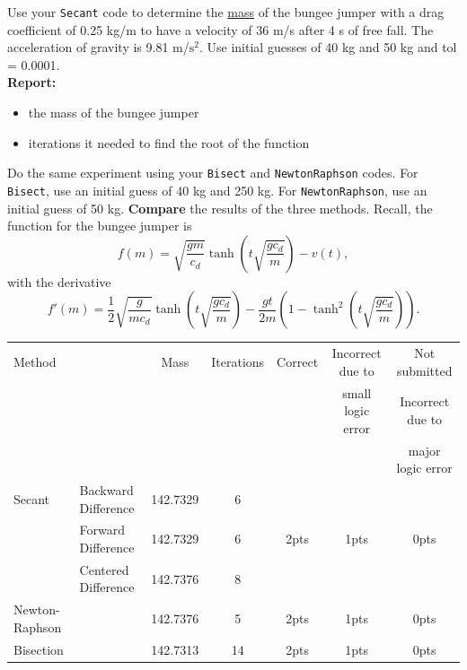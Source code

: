 \documentclass[11pt]{article}
\begin{document}
\begin{enumerate}[(a)]
	Use your \texttt{Secant} code to determine the \underline{mass} of the bungee jumper with a drag coefficient of 0.25 kg/m to have a velocity of 36 m/s after 4 s of free fall. The acceleration of gravity is 9.81 m/$\textrm{s}^2$. Use initial guesses of 40 kg and 50 kg and tol = 0.0001.\\ 
	\vspace{5pt}
	\textbf{Report:}
	\begin{itemize}
		\item the mass of the bungee jumper
		\item iterations it needed to find the root of the function
	\end{itemize}
	Do the same experiment using your \texttt{Bisect} and \texttt{NewtonRaphson} codes. For \texttt{Bisect}, use an initial guess of 40 kg and 250 kg. For \texttt{NewtonRaphson}, use an initial guess of 50 kg. \textbf{Compare} the results of the three methods. Recall, the function for the bungee jumper is
	$$f(m) = \sqrt{\frac{gm}{c_d}}\tanh\left(t\sqrt{\frac{gc_d}{m}}\right) -v(t), $$
	\newpage
	with the derivative
	$$f'(m) = \frac{1}{2}\sqrt{\frac{g}{mc_d}}\tanh\left(t\sqrt{\frac{gc_d}{m}}\right) - \frac{gt}{2m}\left(1-\tanh^2\left(t\sqrt{\frac{gc_d}{m}}\right)\right). $$ 
	\begin{table}[H]
		\centering
		\color{red}
		\begin{tabular}{| l | l | c | c | c | c | c |}
			\hline
			Method &  & Mass & Iterations & Correct & Incorrect due to & Not submitted\\
			       &  &      &            &                  &  small logic error & Incorrect due to \\
			       &  &      &            &                  &                    & major logic error \\
			\hline
			Secant & Backward Difference & 142.7329 & 6 & & &\\
			              & Forward Difference & 142.7329 & 6 & 2pts & 1pts & 0pts\\
			              & Centered Difference &142.7376 & 8 & & &\\
			\hline
			Newton-Raphson & & 142.7376 & 5 & 2pts & 1pts & 0pts\\
			\hline
			Bisection & & 142.7313 & 14 & 2pts & 1pts & 0pts\\
			\hline
		\end{tabular}
	\end{table}
\end{enumerate}
\end{document}
